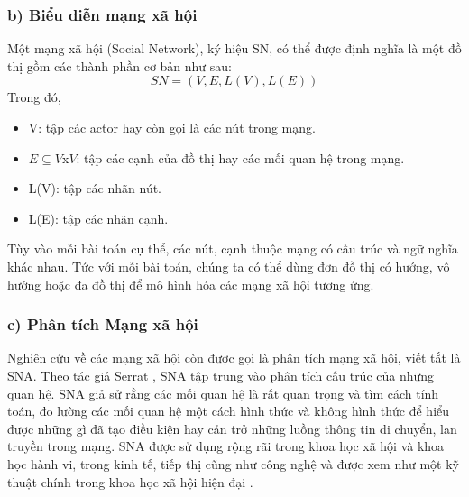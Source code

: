 \subsubsection*{b) Biểu diễn mạng xã hội}
Một mạng xã hội (Social Network), ký hiệu SN, có thể được định nghĩa là một đồ thị gồm các thành phần cơ bản như sau:
\begin{equation}
SN = (V, E, L(V), L(E))
\end{equation}
Trong đó,
\begin{itemize}
\item V: tập các actor hay còn gọi là các nút trong mạng.
\item $E \subseteq V$x$V$: tập các cạnh của đồ thị hay các mối quan hệ trong mạng.
\item L(V): tập các nhãn nút.
\item L(E): tập các nhãn cạnh.
\end{itemize}

Tùy vào mỗi bài toán cụ thể, các nút, cạnh thuộc mạng có cấu trúc và ngữ nghĩa khác nhau. Tức với mỗi bài toán, chúng ta có thể dùng đơn đồ thị có hướng, vô hướng hoặc đa đồ thị để mô hình hóa các mạng xã hội tương ứng.

\subsubsection*{c) Phân tích Mạng xã hội}
Nghiên cứu về các mạng xã hội còn được gọi là phân tích mạng xã hội, viết tắt là SNA. Theo tác giả Serrat \cite{serrat2009social}, SNA tập trung vào phân tích cấu trúc của những quan hệ. SNA giả sử rằng các mối quan hệ là rất quan trọng và tìm cách tính toán, đo lường các mối quan hệ một cách hình thức và không hình thức để hiểu được những gì đã tạo điều kiện hay cản trở những luồng thông tin di chuyển, lan truyền trong mạng. SNA được sử dụng rộng rãi trong khoa học xã hội và khoa học hành vi, trong kinh tế, tiếp thị cũng như công nghệ và được xem như một kỹ thuật chính trong khoa học xã hội hiện đại \cite{Wasserman1994}. 

